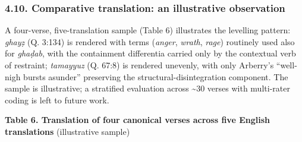 \documentclass[11pt,a4paper]{article}
\begin{document}
\subsubsection{4.10. Comparative translation: an illustrative
observation}\label{comparative-translation-an-illustrative-observation}

A four-verse, five-translation sample (Table 6) illustrates the
levelling pattern: \emph{ghayẓ} (Q. 3:134) is rendered with terms
(\emph{anger}, \emph{wrath}, \emph{rage}) routinely used also for
\emph{ghaḍab}, with the containment differentia carried only by the
contextual verb of restraint; \emph{tamayyuz} (Q. 67:8) is rendered
unevenly, with only Arberry's ``well-nigh bursts asunder'' preserving
the structural-disintegration component. The sample is illustrative; a
stratified evaluation across \textasciitilde30 verses with multi-rater
coding is left to future work.

\textbf{Table 6. Translation of four canonical verses across five
English translations} (illustrative sample)
\end{document}
